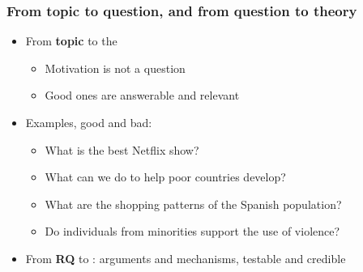 \begin{frame}
\frametitle{From topic to question, and from question to theory}
\centering

\begin{itemize}
  \item[$>$] From \textbf{topic} to the 
  \begin{itemize}
    \item Motivation is not a question
    \item Good ones are answerable and relevant
  \end{itemize}
  \vspace{8pt}
  \item<2->[$>$] Examples, good and bad:
  \begin{itemize}
    \item<2-> What is the best Netflix show?
    \item<2-> What can we do to help poor countries develop?
    \item<2-> What are the shopping patterns of the Spanish population?
    \item<2-> Do individuals from minorities support the use of violence?
  \end{itemize}
  \vspace{8pt}
  \item<3->[$>$] From \textbf{RQ} to : arguments and mechanisms, testable and credible
\end{itemize}

\end{frame}

